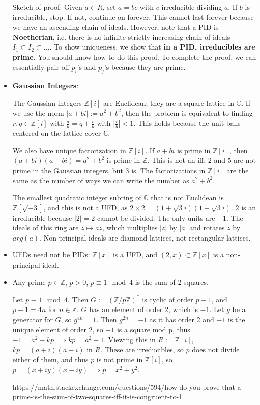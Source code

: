 \documentclass[11pt, oneside]{amsart}   	%
\theoremstyle{definition}
\begin{document}
\begin{itemize}
	Sketch of proof: Given $a\in R$, set $a = bc$ with $c$ irreducible dividing $a$. If $b$ is irreducible, stop. If not, continue on forever. This cannot 
	last forever because we have an ascending chain of ideals. However, note that a PID is \textbf{Noetherian}, i.e. there is no infinite strictly 
	increasing chain of ideals $I_1\subset I_2\subset ...$. To show uniqueness, we show that \textbf{in a PID, irreducibles are prime}. You should 
	know how to do this proof. To complete the proof, we can essentially pair off $p_i$'s and $p_j$'s because they are prime.
	
	\item \textbf{Gaussian Integers}:
	
	The Gaussian integers $\mathbb Z[i]$ are Euclidean; they are a square lattice in $\mathbb C$. If we use the norm $|a + bi| := a^2 + b^2$, then 
	the problem is equivalent to finding $r, q\in \mathbb Z[i]$ with $\frac{a}{b} = q + \frac{r}{b}$ with $|\frac{r}{b}| < 1$. This holds because the unit 
	balls centered on the lattice cover $\mathbb C$.
	
	We also have unique factorization in $\mathbb Z[i]$. If $a + bi$ is prime in $\mathbb Z[i]$, then $(a + bi)(a - bi) = a^2 + b^2$ is prime in $\mathbb 
	Z$. This is not an iff; $2$ and $5$ are not prime in the Gaussian integers, but 3 is. The factorizations in $\mathbb Z[i]$ are the same as the 
	number of ways we can write the number as $a^2 + b^2$.
	
	The smallest quadratic integer subring of $\mathbb C$ that is not Euclidean is $\mathbb Z[\sqrt{-3}]$, and this is not a UFD, as $2 \times 2 = 
	(1 + \sqrt{3}i)(1 - \sqrt{3}i)$. $2$ is an irreducible because $|2| = 2$ cannot be divided. The only units are $\pm 1$. The ideals of this ring are 
	$z\mapsto az$, which multiplies $|z|$ by $|a|$ and rotates $z$ by $arg(a)$. Non-principal ideals are diamond lattices, not rectangular lattices.
	
	\item UFDs need not be PIDs: $\mathbb Z[x]$ is a UFD, and $(2, x)\subset \mathbb Z[x]$ is a non-principal ideal.
	
	\item Any prime $p\in\mathbb Z$, $p > 0$, $p\equiv 1 \mod 4$ is the sum of 2 squares.
	
	Let $p\equiv 1\mod 4$. Then $G := (\mathbb Z/p\mathbb Z)^*$ is cyclic of order $p - 1$, and $p - 1 = 4n$ for $n\in \mathbb Z$. $G$ has an 
	element of order 2, which is $-1$. Let $g$ be a generator for $G$, so $g^{4n} = 1$. Then $g^{2n} = -1$ as it has order 2 and $-1$ is the unique 
	element of order $2$, so $-1$ is a square mod p, thus $-1 = a^2 - kp\implies kp = a^2 + 1$. Viewing this in $R := \mathbb Z[i]$, $kp = (a + i)
	(a - i)$ in $R$. These are irreducibles, so $p$ does not divide either of them, and thus $p$ is not prime in $\mathbb Z[i]$, so $p = (x + iy)(x - iy)
	\implies p = x^2 + y^2$.
	
	https://math.stackexchange.com/questions/594/how-do-you-prove-that-a-prime-is-the-sum-of-two-squares-iff-it-is-congruent-to-1

\end{itemize}
\end{document}
